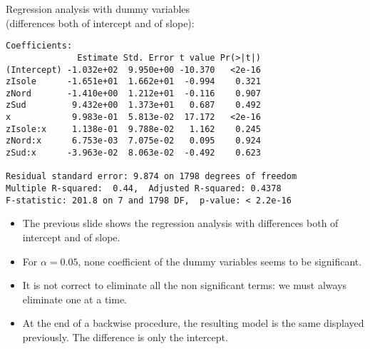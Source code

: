 \begin{frame}[fragile]
  Regression analysis with dummy variables\\ (differences both of intercept and of slope):\\
  \begin{small}
    \begin{verbatim}
Coefficients:
              Estimate Std. Error t value Pr(>|t|)    
(Intercept) -1.032e+02  9.950e+00 -10.370   <2e-16
zIsole      -1.651e+01  1.662e+01  -0.994    0.321    
zNord       -1.410e+00  1.212e+01  -0.116    0.907    
zSud         9.432e+00  1.373e+01   0.687    0.492    
x            9.983e-01  5.813e-02  17.172   <2e-16
zIsole:x     1.138e-01  9.788e-02   1.162    0.245    
zNord:x      6.753e-03  7.075e-02   0.095    0.924    
zSud:x      -3.963e-02  8.063e-02  -0.492    0.623

Residual standard error: 9.874 on 1798 degrees of freedom
Multiple R-squared:  0.44,	Adjusted R-squared: 0.4378 
F-statistic: 201.8 on 7 and 1798 DF,  p-value: < 2.2e-16 
    \end{verbatim}
  \end{small}
\end{frame}

\begin{frame}
  \vspace{0.5cm}
  \begin{itemize}
    \item The previous slide shows the regression analysis with differences both of intercept and of slope.
    \vspace{0.25cm}
    \item For $ \alpha = 0.05 $, none coefficient of the dummy variables seems to be significant.
    \vspace{0.25cm}
    \item It is not correct to eliminate all the non significant terms: we must always eliminate one at a time.
    \vspace{0.25cm}
    \item At the end of a backwise procedure, the resulting model is the same displayed previously. The difference is only the intercept.
  \end{itemize}
\end{frame}





